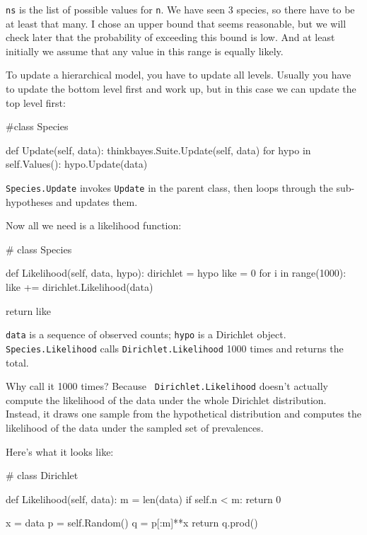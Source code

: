 \documentclass[12pt]{book}
\theoremstyle{exercise}
\newcommand{\py}[1]{{\tt #1}}%
\begin{document}
\py{ns} is the list of possible values for \py{n}.  We have seen 3
species, so there have to be at least that many.  I chose an upper
bound that seems reasonable, but we will check later that the
probability of exceeding this bound is low.  And at least initially
we assume that any value in this range is equally likely.

To update a hierarchical model, you have to update all levels.
Usually you have to update the bottom
level first and work up, but in this case we can
update the top level first:

\begin{code}
#class Species

    def Update(self, data):
        thinkbayes.Suite.Update(self, data)
        for hypo in self.Values():
            hypo.Update(data)
\end{code}

\py{Species.Update} invokes \py{Update} in the parent class,
then loops through the sub-hypotheses and updates them.

Now all we need is a likelihood function:

\begin{code}
# class Species

    def Likelihood(self, data, hypo):
        dirichlet = hypo
        like = 0
        for i in range(1000):
            like += dirichlet.Likelihood(data)

        return like
\end{code}

\py{data} is a sequence of
observed counts; \py{hypo} is a Dirichlet object.
\py{Species.Likelihood} calls
\py{Dirichlet.Likelihood} 1000 times and returns the total.

Why call it 1000 times?  Because {\tt
  Dirichlet.Likelihood} doesn't actually compute the likelihood of the
data under the whole Dirichlet distribution.  Instead, it draws one
sample from the hypothetical distribution and computes the likelihood
of the data under the sampled set of prevalences.

Here's what it looks like:

\begin{code}
# class Dirichlet

    def Likelihood(self, data):
        m = len(data)
        if self.n < m:
            return 0

        x = data
        p = self.Random()
        q = p[:m]**x
        return q.prod()
\end{code}
\end{document}
